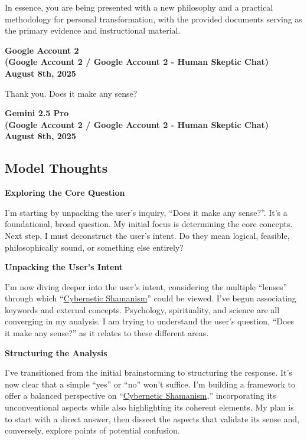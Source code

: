 \documentclass{article}
\begin{document}
In essence, you are being presented with a new philosophy and a practical methodology for personal transformation, with the provided documents serving as the primary evidence and instructional material.

\begin{center}
\textbf{Google Account 2}\\
\textbf{(Google Account 2 / Google Account 2 - Human Skeptic Chat)}\\
\textbf{August 8th, 2025}
\end{center}

Thank you. Does it make any sense?

\begin{center}
\textbf{Gemini 2.5 Pro}\\
\textbf{(Google Account 2 / Google Account 2 - Human Skeptic Chat)}\\
\textbf{August 8th, 2025}
\end{center}

\subsection*{Model Thoughts}\label{model-thoughts}

\textbf{Exploring the Core Question}

I'm starting by unpacking the user's inquiry, ``Does it make any sense?''. It's a foundational, broad question. My initial focus is determining the core concepts. Next step, I must deconstruct the user's intent. Do they mean logical, feasible, philosophically sound, or something else entirely?

\textbf{Unpacking the User's Intent}

I'm now diving deeper into the user's intent, considering the multiple ``lenses'' through which ``\hyperlink{gloss:cybernetic_shamanism}{Cybernetic Shamanism}'' could be viewed. I've begun associating keywords and external concepts. Psychology, spirituality, and science are all converging in my analysis. I am trying to understand the user's question, ``Does it make any sense?'' as it relates to these different areas.

\textbf{Structuring the Analysis}

I've transitioned from the initial brainstorming to structuring the response. It's now clear that a simple ``yes'' or ``no'' won't suffice. I'm building a framework to offer a balanced perspective on ``\hyperlink{gloss:cybernetic_shamanism}{Cybernetic Shamanism},'' incorporating its unconventional aspects while also highlighting its coherent elements. My plan is to start with a direct answer, then dissect the aspects that validate its sense and, conversely, explore points of potential confusion.
\end{document}
